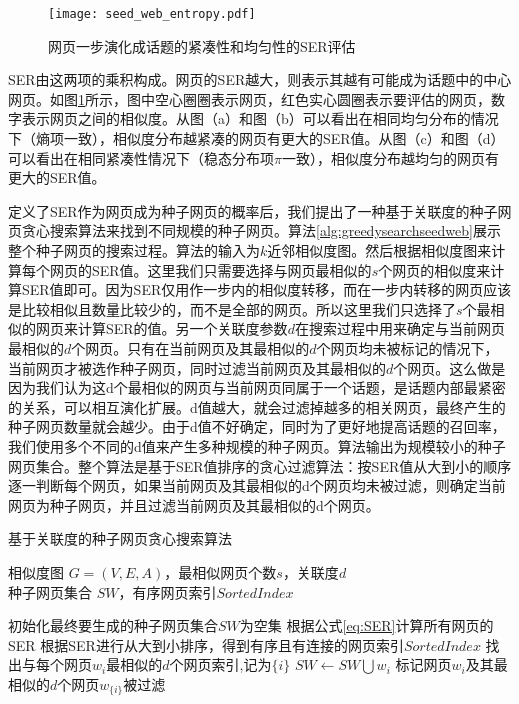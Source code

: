\begin{figure}[!htbp]
    \centering
    \texttt{[image: seed\_web\_entropy.pdf]}
    \caption{网页一步演化成话题的紧凑性和均匀性的SER评估}
    \label{fig:seed_web_entropy}
\end{figure}
SER由这两项的乘积构成。网页的SER越大，则表示其越有可能成为话题中的中心网页。如图\ref{fig:seed_web_entropy}所示，图中空心圈圈表示网页，红色实心圆圈表示要评估的网页，数字表示网页之间的相似度。从图（a）和图（b）可以看出在相同均匀分布的情况下（熵项一致），相似度分布越紧凑的网页有更大的SER值。从图（c）和图（d）可以看出在相同紧凑性情况下（稳态分布项$\pi$一致），相似度分布越均匀的网页有更大的SER值。

定义了SER作为网页成为种子网页的概率后，我们提出了一种基于关联度的种子网页贪心搜索算法来找到不同规模的种子网页。算法\ref{alg:greedysearchseedweb}展示整个种子网页的搜索过程。算法的输入为$k$近邻相似度图。然后根据相似度图来计算每个网页的SER值。这里我们只需要选择与网页最相似的$s$个网页的相似度来计算SER值即可。因为SER仅用作一步内的相似度转移，而在一步内转移的网页应该是比较相似且数量比较少的，而不是全部的网页。所以这里我们只选择了$s$个最相似的网页来计算SER的值。另一个关联度参数$d$在搜索过程中用来确定与当前网页最相似的$d$个网页。只有在当前网页及其最相似的$d$个网页均未被标记的情况下，当前网页才被选作种子网页，同时过滤当前网页及其最相似的$d$个网页。这么做是因为我们认为这d个最相似的网页与当前网页同属于一个话题，是话题内部最紧密的关系，可以相互演化扩展。d值越大，就会过滤掉越多的相关网页，最终产生的种子网页数量就会越少。由于d值不好确定，同时为了更好地提高话题的召回率，我们使用多个不同的d值来产生多种规模的种子网页。算法输出为规模较小的种子网页集合。整个算法是基于SER值排序的贪心过滤算法：按SER值从大到小的顺序逐一判断每个网页，如果当前网页及其最相似的d个网页均未被过滤，则确定当前网页为种子网页，并且过滤当前网页及其最相似的d个网页。
\begin{algorithm}[!htbp]
    \caption{基于关联度的种子网页贪心搜索算法}\label{alg:greedysearchseedweb}
    \hspace*{0.02in}{\bf Input:}
    相似度图 $G=(V,E,A)$，最相似网页个数$s$，关联度$d$\\
    \hspace*{0.02in}{\bf Output:}
    种子网页集合 $SW$，有序网页索引$SortedIndex$
    \begin{algorithmic}[1]
        \State 初始化最终要生成的种子网页集合$SW$为空集
        \State 根据公式\ref{eq:SER}计算所有网页的SER
        \State 根据SER进行从大到小排序，得到有序且有连接的网页索引$SortedIndex$
        \State 找出与每个网页$w_i$最相似的$d$个网页索引,记为$\{i\}$
        \State $SW \leftarrow SW \bigcup w_i$
        \State 标记网页$w_i$及其最相似的$d$个网页$w_{\{i\}}被过滤$
        \EndIf
        \EndFor
    \end{algorithmic}
\end{algorithm}


